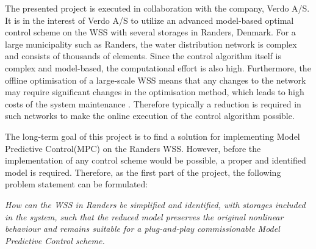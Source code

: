 The presented project is executed in collaboration with the company, Verdo A/S. It is in the interest of Verdo A/S to utilize an advanced model-based optimal control scheme on the WSS with several storages in Randers, Denmark. For a large municipality such as Randers, the water distribution network is complex and consists of thousands of elements. Since the control algorithm itself is complex and model-based, the computational effort is also high. Furthermore, the offline optimisation of a large-scale WSS means that any changes to the network may require significant changes in the optimisation method, which leads to high costs of the system maintenance \cite{brdys1994operational}. Therefore typically a reduction is required in such networks to make the online execution of the control algorithm possible. 

The long-term goal of this project is to find a solution for implementing Model Predictive Control(MPC) on the Randers WSS. However, before the implementation of any control scheme would be possible, a proper and identified model is required. Therefore, as the first part of the project, the following problem statement can be formulated: 

\emph{How can the WSS in Randers be simplified and identified, with storages included in the system, such that the reduced model preserves the original nonlinear behaviour and remains suitable for a plug-and-play commissionable Model Predictive Control scheme.}










